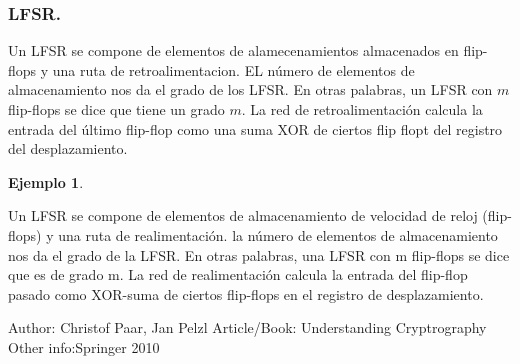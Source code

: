 \documentclass{llncs}
\theoremstyle{plane}
\newtheorem{ej}{Ejemplo}
\begin{document}
\subsubsection{LFSR.}
Un LFSR se compone de elementos de alamecenamientos almacenados en flip-flops y una ruta de retroalimentacion. EL número de elementos de almacenamiento nos da el grado de los LFSR. En otras palabras, un LFSR con $m$ flip-flops se dice que tiene un grado $m$. La red de retroalimentación calcula la entrada del último flip-flop como una suma XOR de ciertos flip flopt del registro del desplazamiento.

\begin{ej}


\end{ej}

Un LFSR se compone de elementos de almacenamiento de velocidad de reloj (flip-flops) y una ruta de realimentación. la
número de elementos de almacenamiento nos da el grado de la LFSR. En otras palabras, una
LFSR con m flip-flops se dice que es de grado m. La red de realimentación calcula
la entrada del flip-flop pasado como XOR-suma de ciertos flip-flops en el registro de desplazamiento.






%
%

\begin{thebibliography}{1}
Author: Christof Paar, Jan Pelzl
Article/Book: Understanding Cryptrography
Other info:Springer 2010
\end{thebibliography}
\end{document}
